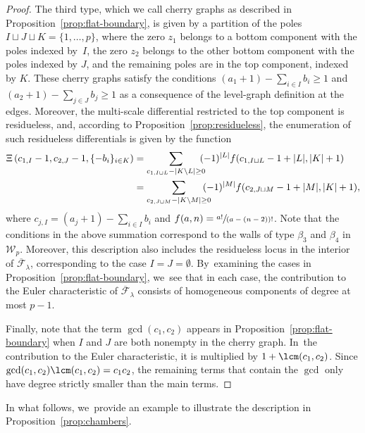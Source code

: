 \begin{proof}
The third type, which we call cherry graphs as described in Proposition~\ref{prop:flat-boundary}, is given by a partition of the poles $I\sqcup J \sqcup K=\{1,\ldots,p\}$, where the zero $z_1$ belongs to a bottom component with the poles indexed by~$I$, the zero $z_2$ belongs to the other bottom component with the poles indexed by $J$, and the remaining poles are in the top component, indexed by $K$. These cherry graphs satisfy the conditions $(a_1+1)-\sum_{i\in I}b_i\geq 1$ and $(a_2+1)-\sum_{j\in J}b_j\geq 1$ as a consequence of the level-graph definition at the edges. Moreover, the multi-scale differential restricted to the top component is residueless, and, according to Proposition~\ref{prop:residueless}, the enumeration of such residueless differentials is given by the function
\begin{align*}
\Xi\left(c_{1,I}-1,c_{2,J}-1, \{-b_i\}_{i\in K}\right) & = \sum_{c_{1,I\sqcup L}-|K\setminus L|\geq 0}\hspace*{-2mm}(-1)^{|L|}f(c_{1,I\sqcup L}-1+|L|,|K|+1)\\
& = \sum_{c_{2,J\sqcup M}-|K\setminus M|\geq 0}\hspace*{-3mm}(-1)^{|M|}f(c_{2,J\sqcup M}-1+|M|,|K|+1),
\end{align*}
where $c_{j,I}=(a_j+1)-\sum_{i\in I}b_i$ and $f(a,n)=\sfrac{a!}{(a-(n-2))!}$. Note that the conditions in the above summation correspond to the walls of type $\beta_3$ and $\beta_4$ in $\mathcal{W}_p$. Moreover, this description also includes the residueless locus in the interior of $\overline{\mathcal{F}}_\lambda$, corresponding to the case $I=J=\emptyset$. By~examining the cases in Proposition~\ref{prop:flat-boundary}, we~see that in each case, the contribution to the Euler characteristic of $\overline{\mathcal{F}}_\lambda$ consists of homogeneous components of degree at most $p-1$.

Finally, note that the term $\gcd (c_1, c_2)$ appears in Proposition~\ref{prop:flat-boundary}
when $I$ and $J$ are both nonempty in the cherry graph. In~the contribution to the Euler characteristic, it is multiplied by $1+\lcm (c_1, c_2)$. Since $\gcd(c_1, c_2) \lcm(c_1, c_2) = c_1c_2$, the remaining terms that contain the $\gcd$ only have degree strictly smaller than the main terms.
\end{proof}

In what follows, we~provide an example to illustrate the description in Proposition~\ref{prop:chambers}.

